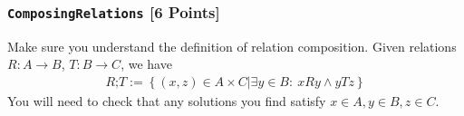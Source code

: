 %
%
%
%


\subsubsection{\texttt{ComposingRelations} [6 Points]}
Make sure you understand the definition of relation composition. Given relations $R: A \to B$, $T: B \to C$, we have
\begin{align*}
  R \texttt{;}T := \left\{
    (x,z) \in A \times C \big\vert
    \exists y \in B\colon\ xRy \land yTz
  \right\}
\end{align*}
You will need to check that any solutions you find satisfy $x \in A, y \in B, z \in C$.


